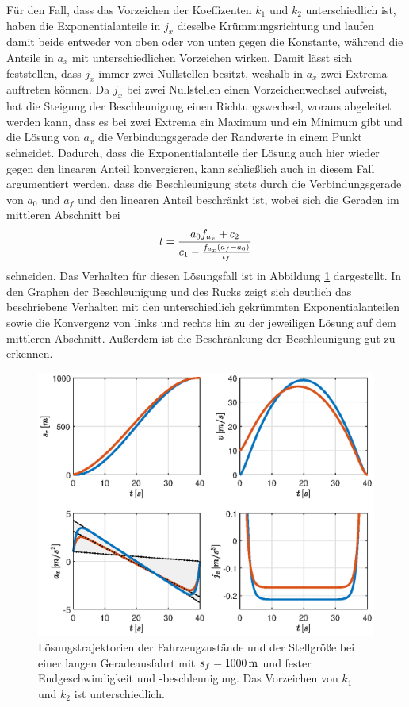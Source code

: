Für den Fall, dass das Vorzeichen der Koeffizenten $k_1$ und $k_2$ unterschiedlich ist, haben die Exponentialanteile in $j_x$ dieselbe Krümmungsrichtung und laufen damit beide entweder von oben oder von unten gegen die Konstante, während die Anteile in $a_x$ mit unterschiedlichen Vorzeichen wirken. Damit lässt sich feststellen, dass $j_x$ immer zwei Nullstellen besitzt, weshalb in $a_x$ zwei Extrema auftreten können. Da $j_x$ bei zwei Nullstellen einen Vorzeichenwechsel aufweist, hat die Steigung der Beschleunigung einen Richtungswechsel, woraus abgeleitet werden kann, dass es bei zwei Extrema ein Maximum und ein Minimum gibt und die Lösung von $a_x$ die Verbindungsgerade der Randwerte in einem Punkt schneidet. Dadurch, dass die Exponentialanteile der Lösung auch hier wieder gegen den linearen Anteil konvergieren, kann schließlich auch in diesem Fall argumentiert werden, dass die Beschleunigung stets durch die Verbindungsgerade von $a_0$ und $a_f$ und den linearen Anteil beschränkt ist, wobei sich die Geraden im mittleren Abschnitt bei 
\begin{equation}
t = \frac{a_0f_{a_x} + c_2}{c_1 - \frac{f_{a_x}(a_f - a_0)}{t_f}}
\end{equation} 
schneiden. Das Verhalten für diesen Lösungsfall ist in Abbildung \ref{fig:vf_af_fest_unterschiedliches_VZ} dargestellt. In den Graphen der Beschleunigung und des Rucks zeigt sich deutlich das beschriebene Verhalten mit den unterschiedlich gekrümmten Exponentialanteilen sowie die Konvergenz von links und rechts hin zu der jeweiligen Lösung auf dem mittleren Abschnitt. Außerdem ist die Beschränkung der Beschleunigung gut zu erkennen. 
\begin{figure}[h] 
	\centering
	\includegraphics[width=\linewidth]{./Bilder/Ergebnisse/Geradeausfahrt/vf_af_fest_unterschiedliches_VZ.eps}
	\caption{Lösungstrajektorien der Fahrzeugzustände und der Stellgröße bei einer langen Geradeausfahrt mit $s_f=1000\,\mathrm{m}$ und fester Endgeschwindigkeit und -beschleunigung. Das Vorzeichen von $k_1$ und $k_2$ ist unterschiedlich.}
	\label{fig:vf_af_fest_unterschiedliches_VZ}
\end{figure}

